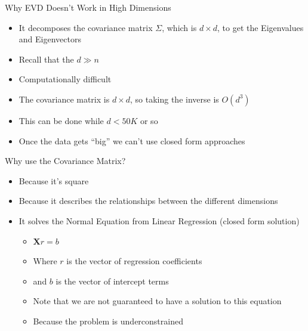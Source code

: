 \documentclass[aspectratio=169]{beamer}
\begin{document}
\begin{frame}{Why  EVD Doesn't Work in High Dimensions}

\begin{itemize}
	\item It decomposes the covariance matrix $\Sigma$, which is $d \times d$, to get the Eigenvalues and Eigenvectors
	\item Recall that the $d \gg n$
		\item Computationally difficult
		\item The covariance matrix is $d \times d$, so taking the inverse is $O(d^3)$
		\item This can be done while $d < 50K$ or so
		\item Once the data gets ``big'' we can't use closed form approaches
\end{itemize}
\end{frame}
\begin{frame}{Why use the Covariance Matrix?}

\begin{itemize}
\item Because it's square
\item Because it describes the relationships between the different dimensions %
\item It solves the Normal Equation from Linear Regression (closed form solution)
\begin{itemize}
\item $\textbf{X}r = b$
\item Where $r$ is the vector of regression coefficients
\item and $b$ is the vector of intercept terms
\item Note that we are not guaranteed to have a solution to this equation
\item Because the problem is underconstrained
\end{itemize}
\end{itemize}
\end{frame}
\end{document}
